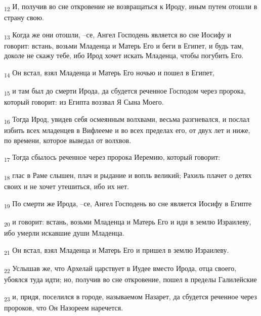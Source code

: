 \begin{tcolorbox}
\textsubscript{12} И, получив во сне откровение не возвращаться к Ироду, иным путем отошли в страну свою.
\end{tcolorbox}
\begin{tcolorbox}
\textsubscript{13} Когда же они отошли, --се, Ангел Господень является во сне Иосифу и говорит: встань, возьми Младенца и Матерь Его и беги в Египет, и будь там, доколе не скажу тебе, ибо Ирод хочет искать Младенца, чтобы погубить Его.
\end{tcolorbox}
\begin{tcolorbox}
\textsubscript{14} Он встал, взял Младенца и Матерь Его ночью и пошел в Египет,
\end{tcolorbox}
\begin{tcolorbox}
\textsubscript{15} и там был до смерти Ирода, да сбудется реченное Господом через пророка, который говорит: из Египта воззвал Я Сына Моего.
\end{tcolorbox}
\begin{tcolorbox}
\textsubscript{16} Тогда Ирод, увидев себя осмеянным волхвами, весьма разгневался, и послал избить всех младенцев в Вифлееме и во всех пределах его, от двух лет и ниже, по времени, которое выведал от волхвов.
\end{tcolorbox}
\begin{tcolorbox}
\textsubscript{17} Тогда сбылось реченное через пророка Иеремию, который говорит:
\end{tcolorbox}
\begin{tcolorbox}
\textsubscript{18} глас в Раме слышен, плач и рыдание и вопль великий; Рахиль плачет о детях своих и не хочет утешиться, ибо их нет.
\end{tcolorbox}
\begin{tcolorbox}
\textsubscript{19} По смерти же Ирода, --се, Ангел Господень во сне является Иосифу в Египте
\end{tcolorbox}
\begin{tcolorbox}
\textsubscript{20} и говорит: встань, возьми Младенца и Матерь Его и иди в землю Израилеву, ибо умерли искавшие души Младенца.
\end{tcolorbox}
\begin{tcolorbox}
\textsubscript{21} Он встал, взял Младенца и Матерь Его и пришел в землю Израилеву.
\end{tcolorbox}
\begin{tcolorbox}
\textsubscript{22} Услышав же, что Архелай царствует в Иудее вместо Ирода, отца своего, убоялся туда идти; но, получив во сне откровение, пошел в пределы Галилейские
\end{tcolorbox}
\begin{tcolorbox}
\textsubscript{23} и, придя, поселился в городе, называемом Назарет, да сбудется реченное через пророков, что Он Назореем наречется.
\end{tcolorbox}
